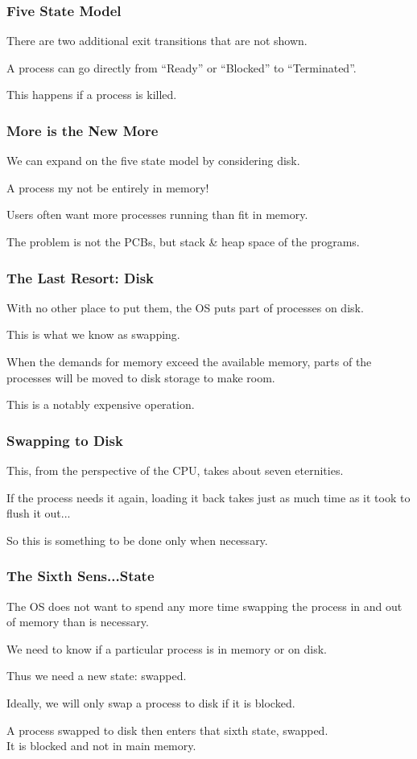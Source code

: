 \begin{frame}
	\frametitle{Five State Model}

	There are two additional exit transitions that are not shown.

	A process can go directly from ``Ready'' or ``Blocked'' to ``Terminated''.

	This happens if a process is killed.

\end{frame}

\begin{frame}
	\frametitle{More is the New More}

	We can expand on the five state model by considering disk.

	A process my not be entirely in memory!

	Users often want more processes running than fit in memory.

	The problem is not the PCBs, but stack \& heap space of the programs.

\end{frame}

\begin{frame}
	\frametitle{The Last Resort: Disk}

	With no other place to put them, the OS puts part of processes on disk.

	This is what we know as \alert{swapping}.

	When the demands for memory exceed the available memory, parts of the processes will be moved to disk storage to make room.

	This is a notably expensive operation.
\end{frame}

\begin{frame}
	\frametitle{Swapping to Disk}

	This, from the perspective of the CPU, takes about seven eternities.

	If the process needs it again, loading it back takes just as much time as it took to flush it out...

	So this is something to be done only when necessary.

\end{frame}

\begin{frame}
	\frametitle{The Sixth Sens...State}

	The OS does not want to spend any more time swapping the process in and out of memory than is necessary.

	We need to know if a particular process is in memory or on disk.

	Thus we need a new state: swapped.

	Ideally, we will only swap a process to disk if it is blocked.

	A process swapped to disk then enters that sixth state, swapped.\\
	\quad It is blocked and not in main memory.

\end{frame}

